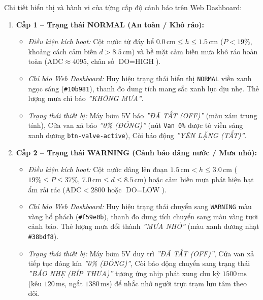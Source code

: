 Chi tiết hiển thị và hành vi của từng cấp độ cảnh báo trên Web Dashboard:
\begin{enumerate}
    \item \textbf{Cấp 1 -- Trạng thái NORMAL (An toàn / Khô ráo):}
    \begin{itemize}
        \item \textit{Điều kiện kích hoạt:} Cột nước từ đáy bể $0.0\,\text{cm} \le h \le 1.5\,\text{cm}$ ($P < 19\%$, khoảng cách cảm biến $d > 8.5\,\text{cm}$) và bề mặt cảm biến mưa khô ráo hoàn toàn ($\text{ADC} \approx 4095$, chân số $\text{DO} = \text{HIGH}$).
        \item \textit{Chỉ báo Web Dashboard:} Huy hiệu trạng thái hiển thị \texttt{NORMAL} viền xanh ngọc sáng (\texttt{\#10b981}), thanh đo dung tích mang sắc xanh lục dịu nhẹ. Thẻ lượng mưa chỉ báo \textit{''KHÔNG MƯA''}.
        \item \textit{Trạng thái thiết bị:} Máy bơm 5V báo \textit{''ĐÃ TẮT (OFF)''} (màu xám trung tính), Cửa van xả báo \textit{''0\% (ĐÓNG)''} (nút \texttt{Van 0\%} được tô viền sáng xanh dương \texttt{btn-valve-active}), Còi báo động \textit{''YÊN LẶNG (TẮT)''}.
    \end{itemize}

    \item \textbf{Cấp 2 -- Trạng thái WARNING (Cảnh báo dâng nước / Mưa nhỏ):}
    \begin{itemize}
        \item \textit{Điều kiện kích hoạt:} Cột nước dâng lên đoạn $1.5\,\text{cm} < h \le 3.0\,\text{cm}$ ($19\% \le P \le 37\%$, $7.0\,\text{cm} \le d \le 8.5\,\text{cm}$) hoặc cảm biến mưa phát hiện hạt ẩm rải rác ($\text{ADC} < 2800$ hoặc $\text{DO} = \text{LOW}$).
        \item \textit{Chỉ báo Web Dashboard:} Huy hiệu trạng thái chuyển sang \texttt{WARNING} màu vàng hổ phách (\texttt{\#f59e0b}), thanh đo dung tích chuyển sang màu vàng tươi cảnh báo. Thẻ lượng mưa đổi thành \textit{''MƯA NHỎ''} (màu xanh dương nhạt \texttt{\#38bdf8}).
        \item \textit{Trạng thái thiết bị:} Máy bơm 5V duy trì \textit{''ĐÃ TẮT (OFF)''}, Cửa van xả tiếp tục đóng kín \textit{''0\% (ĐÓNG)''}, Còi báo động chuyển sang trạng thái \textit{''BÁO NHẸ (BÍP THƯA)''} tương ứng nhịp phát xung chu kỳ $1500\,\text{ms}$ (kêu $120\,\text{ms}$, ngắt $1380\,\text{ms}$) để nhắc nhở người trực trạm lưu tâm theo dõi.
    \end{itemize}


\end{enumerate}

